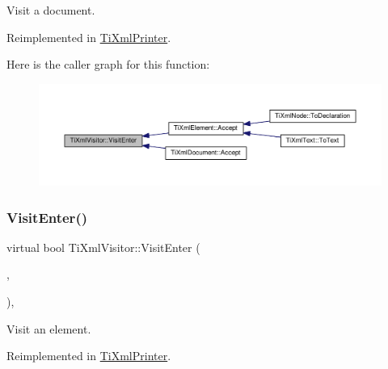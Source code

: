 Visit a document. 



Reimplemented in \hyperlink{class_ti_xml_printer_a2ec73087db26ff4d2c4316c56f861db7}{Ti\+Xml\+Printer}.

Here is the caller graph for this function\+:\nopagebreak
\begin{figure}[H]
\begin{center}
\leavevmode
\includegraphics[width=350pt]{class_ti_xml_visitor_a07baecb52dd7d8716ae2a48ad0956ee0_icgraph}
\end{center}
\end{figure}
\mbox{\label{class_ti_xml_visitor_af6c6178ffa517bbdba95d70490875fff}} 
\subsubsection{\texorpdfstring{Visit\+Enter()}{VisitEnter()}\hspace{0.1cm}{\footnotesize\ttfamily [2/2]}}
{\footnotesize\ttfamily virtual bool Ti\+Xml\+Visitor\+::\+Visit\+Enter (\begin{DoxyParamCaption}\item[{const \hyperlink{class_ti_xml_element}{Ti\+Xml\+Element} \&}]{,  }\item[{const \hyperlink{class_ti_xml_attribute}{Ti\+Xml\+Attribute} $\ast$}]{ }\end{DoxyParamCaption})\hspace{0.3cm}{\ttfamily [inline]}, {\ttfamily [virtual]}}



Visit an element. 



Reimplemented in \hyperlink{class_ti_xml_printer_a6dccaf5ee4979f13877690afe28721e8}{Ti\+Xml\+Printer}.

\mbox{\label{class_ti_xml_visitor_aa0ade4f27087447e93974e975c3246ad}} 
